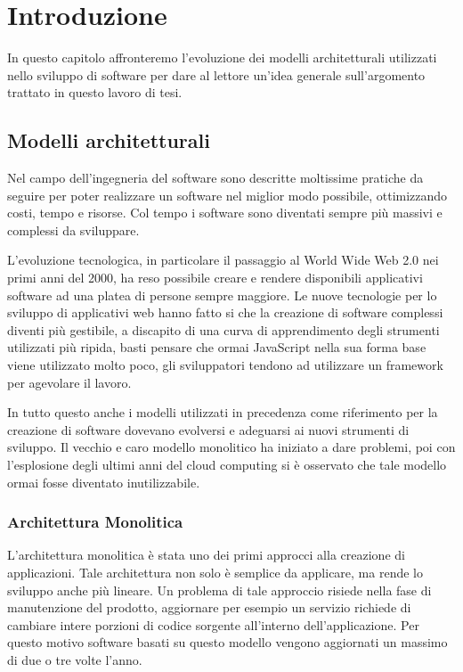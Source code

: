 \chapter{Introduzione}
In questo capitolo affronteremo l'evoluzione dei modelli architetturali utilizzati nello sviluppo di software per dare al lettore un'idea generale sull'argomento trattato in questo lavoro di tesi.

\section{Modelli architetturali}
Nel campo dell'ingegneria del software sono descritte moltissime pratiche da seguire per poter realizzare un software nel miglior modo possibile, ottimizzando costi, tempo e risorse. Col tempo i software sono diventati sempre più massivi e complessi da sviluppare. 

L'evoluzione tecnologica, in particolare il passaggio al World Wide Web 2.0 nei primi anni del 2000, ha reso possibile creare e rendere disponibili applicativi software ad una platea di persone sempre maggiore. Le nuove tecnologie per lo sviluppo di applicativi web hanno fatto si che la creazione di software complessi diventi più gestibile, a discapito di una curva di apprendimento degli strumenti utilizzati più ripida, basti pensare che ormai JavaScript nella sua forma base viene utilizzato molto poco, gli sviluppatori tendono ad utilizzare un framework per agevolare il lavoro.

In tutto questo anche i modelli utilizzati in precedenza come riferimento per la creazione di software dovevano evolversi e adeguarsi ai nuovi strumenti di sviluppo. Il vecchio e caro modello monolitico ha iniziato a dare problemi, poi con l'esplosione degli ultimi anni del cloud computing si è osservato che tale modello ormai fosse diventato inutilizzabile.

\subsection{Architettura Monolitica}
L'architettura monolitica \cite{Architettura_Applicativa} è stata uno dei primi approcci alla creazione di applicazioni. Tale architettura non solo è semplice da applicare, ma rende lo sviluppo anche più lineare. Un problema di tale approccio risiede nella fase di manutenzione del prodotto, aggiornare per esempio un servizio richiede di cambiare intere porzioni di codice sorgente all'interno dell'applicazione. Per questo motivo software basati su questo modello vengono aggiornati un massimo di due o tre volte l'anno.

